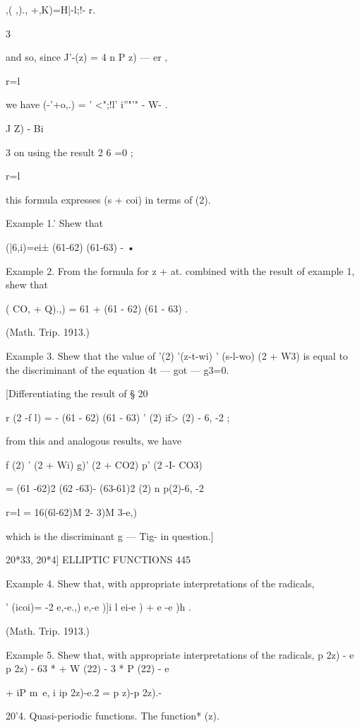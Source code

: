 {,( ,)., +,K)=H|-l;!- r.



3



and so, since J'-(z) = 4 n P z) — er ,



r=l

we have (-'+o,.) = ' <";!l' i''"'" - W- .

 J Z) - Bi

3 on using the result 2 6 =0 ;

r=l

this formula expresses (s + coi) in terms of (2).

Example 1.' Shew that

  (|6,i)=ei± (61-62) (61-63) - •

Example 2. From the formula for z + at. combined with the result of
example 1, shew that

  ( CO, + Q).,) = 61 + (61 - 62) (61 - 63) .

(Math. Trip. 1913.)

Example 3. Shew that the value of '(2) '(z-t-wi) ' (s-l-wo) (2 + W3)
is equal to the discriminant of the equation 4t — got — g3=0.

[Differentiating the result of § 20%

r (2 -f l) = - (61 - 62) (61 - 63) ' (2) if> (2) - 6, -2 ;

from this and analogous results, we have

f (2) ' (2 + Wi) g)' (2 + CO2) p' (2 -I- CO3)

= (61 -62)2 (62 -63)- (63-61)2 (2) n p(2)-6, -2

r=l = 16(6l-62)M 2- 3)M 3-e,)

which is the discriminant g — Tig- in question.]



20*33, 20*4] ELLIPTIC FUNCTIONS 445

Example 4. Shew that, with appropriate interpretations of the
radicals,

 ' (icoi)= -2 e,-e.,) e,-e )]i l ei-e ) + e -e )h .

(Math. Trip. 1913.)

Example 5. Shew that, with appropriate interpretations of the
radicals, p 2z) - e p 2z) - 63 * + W (22) - 3 * P (22) - e

+ iP m~e, i ip 2z)-e.2 = p z)-p 2z).-

20'4. Quasi-periodic functions. The function* (z).

}
